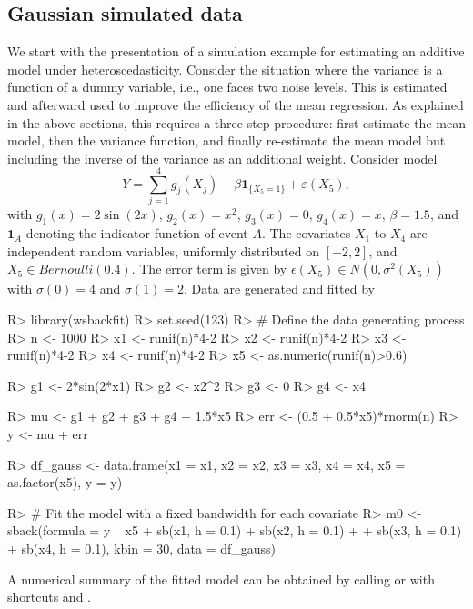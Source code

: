 \subsection{Gaussian simulated data} \label{subsec-gauss}
We start with the presentation of a simulation example for estimating an additive model under heteroscedasticity.
Consider the situation where the variance is a function of a dummy variable, i.e., one faces two noise levels.
This is estimated and afterward used to improve the efficiency of the mean regression. 
As explained in the above sections, this requires a three-step procedure: 
first estimate the mean model, then the variance function, and finally re-estimate the mean model but including the inverse of the variance as an additional weight. 
Consider model
\begin{equation}
Y = \sum_{j=1}^4 g_j(X_j) + \beta \mathbf{1}_{\{X_5 =1\}} + \varepsilon(X_5),\label{ex1}
\end{equation}
with $g_1(x)=2\sin(2x)$, $g_2(x)=x^2$, $g_3(x)=0$, $g_4(x)=x$, $\beta = 1.5$, and $\mathbf{1}_{A}$ denoting the indicator function of event $A$. The covariates $X_1$ to $X_4$ are independent random variables, uniformly distributed on $[-2,2]$, and $X_5 \in Bernoulli (0.4)$. The error term is given by $\epsilon(X_5) \in N(0, \sigma^2 (X_5))$ with  $\sigma(0)=4$ and $\sigma(1)=2$. Data are generated and fitted by
\begin{Schunk}
\begin{Sinput}
R> library(wsbackfit)
R> set.seed(123)
R> # Define the data generating process
R> n <- 1000
R> x1 <- runif(n)*4-2
R> x2 <- runif(n)*4-2
R> x3 <- runif(n)*4-2
R> x4 <- runif(n)*4-2
R> x5 <- as.numeric(runif(n)>0.6)

R> g1 <- 2*sin(2*x1)
R> g2 <- x2^2
R> g3 <- 0
R> g4 <- x4

R> mu <- g1 + g2 + g3 + g4 + 1.5*x5
R> err <- (0.5 + 0.5*x5)*rnorm(n)
R> y <- mu + err

R>  df_gauss <- data.frame(x1 = x1, x2 = x2, x3 = x3, x4 = x4, x5 = as.factor(x5), y = y)

R> # Fit the model with a fixed bandwidth for each covariate
R> m0 <- sback(formula = y ~ x5 + sb(x1, h = 0.1) + sb(x2, h = 0.1) +
+    sb(x3, h = 0.1) + sb(x4, h = 0.1), kbin = 30, data = df_gauss)
\end{Sinput}
\end{Schunk}

A numerical summary of the fitted model can be obtained by calling   or  
with shortcuts   and  .

